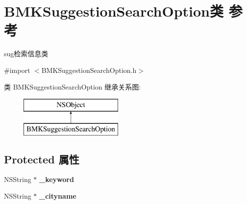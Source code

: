 \hypertarget{interface_b_m_k_suggestion_search_option}{}\section{B\+M\+K\+Suggestion\+Search\+Option类 参考}
\label{interface_b_m_k_suggestion_search_option}


sug检索信息类  




{\ttfamily \#import $<$B\+M\+K\+Suggestion\+Search\+Option.\+h$>$}

类 B\+M\+K\+Suggestion\+Search\+Option 继承关系图\+:\begin{figure}[H]
\begin{center}
\leavevmode
\includegraphics[height=2.000000cm]{interface_b_m_k_suggestion_search_option}
\end{center}
\end{figure}
\subsection*{Protected 属性}
\begin{DoxyCompactItemize}
\item 
\hypertarget{interface_b_m_k_suggestion_search_option_ae4f74fcd89bf2c869f7b140998b9836f}{}N\+S\+String $\ast$ {\bfseries \+\_\+keyword}\label{interface_b_m_k_suggestion_search_option_ae4f74fcd89bf2c869f7b140998b9836f}

\item 
\hypertarget{interface_b_m_k_suggestion_search_option_a3e69b3fe06083ba59dc4c3c6d5f90e98}{}N\+S\+String $\ast$ {\bfseries \+\_\+cityname}\label{interface_b_m_k_suggestion_search_option_a3e69b3fe06083ba59dc4c3c6d5f90e98}

\end{DoxyCompactItemize}

